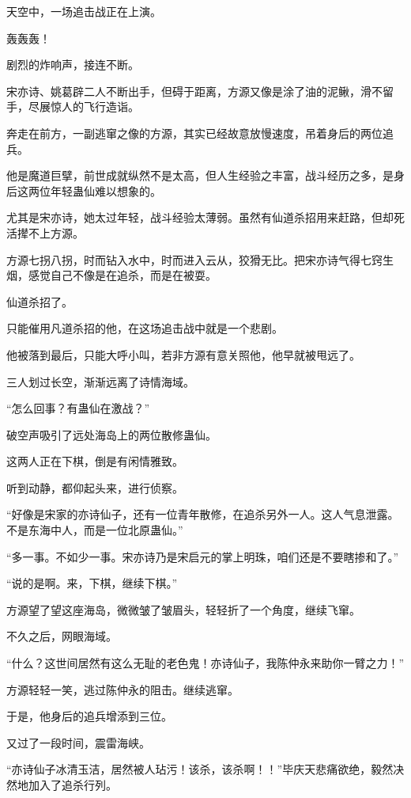 
\begin{this_body}

天空中，一场追击战正在上演。

轰轰轰！

剧烈的炸响声，接连不断。

宋亦诗、姚葛辟二人不断出手，但碍于距离，方源又像是涂了油的泥鳅，滑不留手，尽展惊人的飞行造诣。

奔走在前方，一副逃窜之像的方源，其实已经故意放慢速度，吊着身后的两位追兵。

他是魔道巨擘，前世成就纵然不是太高，但人生经验之丰富，战斗经历之多，是身后这两位年轻蛊仙难以想象的。

尤其是宋亦诗，她太过年轻，战斗经验太薄弱。虽然有仙道杀招用来赶路，但却死活撵不上方源。

方源七拐八拐，时而钻入水中，时而进入云从，狡猾无比。把宋亦诗气得七窍生烟，感觉自己不像是在追杀，而是在被耍。

仙道杀招了。

只能催用凡道杀招的他，在这场追击战中就是一个悲剧。

他被落到最后，只能大呼小叫，若非方源有意关照他，他早就被甩远了。

三人划过长空，渐渐远离了诗情海域。

“怎么回事？有蛊仙在激战？”

破空声吸引了远处海岛上的两位散修蛊仙。

这两人正在下棋，倒是有闲情雅致。

听到动静，都仰起头来，进行侦察。

“好像是宋家的亦诗仙子，还有一位青年散修，在追杀另外一人。这人气息泄露。不是东海中人，而是一位北原蛊仙。”

“多一事。不如少一事。宋亦诗乃是宋启元的掌上明珠，咱们还是不要瞎掺和了。”

“说的是啊。来，下棋，继续下棋。”

方源望了望这座海岛，微微皱了皱眉头，轻轻折了一个角度，继续飞窜。

不久之后，网眼海域。

“什么？这世间居然有这么无耻的老色鬼！亦诗仙子，我陈仲永来助你一臂之力！”

方源轻轻一笑，逃过陈仲永的阻击。继续逃窜。

于是，他身后的追兵增添到三位。

又过了一段时间，震雷海峡。

“亦诗仙子冰清玉洁，居然被人玷污！该杀，该杀啊！！”毕庆天悲痛欲绝，毅然决然地加入了追杀行列。


\end{this_body}
